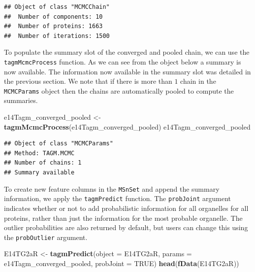 \documentclass[
]{article}
\newenvironment{Shaded}{\begin{snugshade}}{\end{snugshade}}
\newcommand{\DataTypeTok}[1]{\textcolor[rgb]{0.13,0.29,0.53}{#1}}
\newcommand{\KeywordTok}[1]{\textcolor[rgb]{0.13,0.29,0.53}{\textbf{#1}}}
\newcommand{\NormalTok}[1]{#1}
\newcommand{\OtherTok}[1]{\textcolor[rgb]{0.56,0.35,0.01}{#1}}
\newcommand{\StringTok}[1]{\textcolor[rgb]{0.31,0.60,0.02}{#1}}
\begin{document}
\begin{verbatim}
## Object of class "MCMCChain"
##  Number of components: 10 
##  Number of proteins: 1663 
##  Number of iterations: 1500
\end{verbatim}

To populate the summary slot of the converged and pooled chain, we can
use the \texttt{tagmMcmcProcess} function. As we can see from the object
below a summary is now available. The information now available in the
summary slot was detailed in the previous section. We note that if there
is more than \(1\) chain in the \texttt{MCMCParams} object then the
chains are automatically pooled to compute the summaries.

\begin{Shaded}
\begin{Highlighting}[]
\NormalTok{e14Tagm_converged_pooled <-}\StringTok{ }\KeywordTok{tagmMcmcProcess}\NormalTok{(e14Tagm_converged_pooled)}
\NormalTok{e14Tagm_converged_pooled}
\end{Highlighting}
\end{Shaded}

\begin{verbatim}
## Object of class "MCMCParams"
## Method: TAGM.MCMC 
## Number of chains: 1 
## Summary available
\end{verbatim}

To create new feature columns in the \texttt{MSnSet} and append the
summary information, we apply the \texttt{tagmPredict} function. The
\texttt{probJoint} argument indicates whether or not to add
probabilistic information for all organelles for all proteins, rather
than just the information for the most probable organelle. The outlier
probabilities are also returned by default, but users can change this
using the \texttt{probOutlier} argument.

\begin{Shaded}
\begin{Highlighting}[]
\NormalTok{E14TG2aR <-}\StringTok{ }\KeywordTok{tagmPredict}\NormalTok{(}\DataTypeTok{object =}\NormalTok{ E14TG2aR,}
                        \DataTypeTok{params =}\NormalTok{ e14Tagm_converged_pooled,}
                        \DataTypeTok{probJoint =} \OtherTok{TRUE}\NormalTok{)}
\KeywordTok{head}\NormalTok{(}\KeywordTok{fData}\NormalTok{(E14TG2aR))}
\end{Highlighting}
\end{Shaded}
\end{document}
